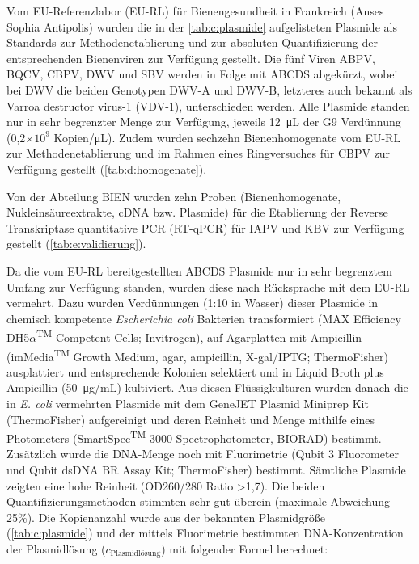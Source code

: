 Vom EU-Referenzlabor (EU-RL) für Bienengesundheit in Frankreich (Anses Sophia Antipolis) wurden die in der \cref{tab:c:plasmide} aufgelisteten Plasmide als Standards zur Methodenetablierung und zur absoluten Quantifizierung der entsprechenden Bienenviren zur Verfügung gestellt. Die fünf Viren ABPV, BQCV, CBPV, DWV und SBV werden in Folge mit ABCDS abgekürzt, wobei bei DWV die beiden Genotypen DWV-A und DWV-B, letzteres auch bekannt als Varroa destructor virus-1 (VDV-1), unterschieden werden. Alle Plasmide standen nur in sehr begrenzter Menge zur Verfügung, jeweils \SI{12}{\micro\liter} der G9 Verdünnung (0,2×$10^9$ Kopien/\si{\micro\liter}). Zudem wurden sechzehn Bienenhomogenate vom EU-RL zur Methodenetablierung und im Rahmen eines Ringversuches für CBPV zur Verfügung gestellt (\cref{tab:d:homogenate}).





Von der Abteilung BIEN wurden zehn Proben (Bienenhomogenate, Nukleinsäureextrakte, cDNA bzw. Plasmide) für die Etablierung der Reverse Transkriptase quantitative PCR (RT-qPCR) für IAPV und KBV zur Verfügung gestellt (\cref{tab:e:validierung}).



Da die vom EU-RL bereitgestellten ABCDS Plasmide nur in sehr begrenztem Umfang zur Verfügung standen, wurden diese nach Rücksprache mit dem EU-RL vermehrt. Dazu wurden Verdünnungen (1:10 in Wasser) dieser Plasmide in chemisch kompetente \textit{Escherichia coli} Bakterien transformiert (MAX Efficiency\textsuperscript{\textregistered}
 DH5$\alpha$\textsuperscript{TM} Competent Cells; Invitrogen), auf Agarplatten mit Ampicillin (imMedia\textsuperscript{TM} Growth Medium, agar, ampicillin, X-gal/IPTG; ThermoFisher) ausplattiert und entsprechende Kolonien selektiert und in Liquid Broth plus Ampicillin (\SI{50}{\micro\gram}/\si{\milli\liter}) kultiviert. Aus diesen Flüssigkulturen wurden danach die in \textit{E. coli} vermehrten Plasmide mit dem GeneJET Plasmid Miniprep Kit (ThermoFisher) aufgereinigt und deren Reinheit und Menge mithilfe eines Photometers (SmartSpec\textsuperscript{TM} 3000 Spectrophotometer, BIORAD) bestimmt. Zusätzlich wurde die DNA-Menge noch mit Fluorimetrie (Qubit 3 Fluorometer und Qubit dsDNA BR Assay Kit; ThermoFisher) bestimmt. Sämtliche Plasmide zeigten eine hohe Reinheit (OD260/280 Ratio >1,7). Die beiden Quantifizierungsmethoden stimmten sehr gut überein (maximale Abweichung 25\%). 
 \newpage
 Die Kopienanzahl wurde aus der bekannten Plasmidgröße (\cref{tab:c:plasmide}) und der mittels Fluorimetrie bestimmten DNA-Konzentration der Plasmidlösung ($c_{\text{Plasmidlösung}}$) mit folgender Formel berechnet:

